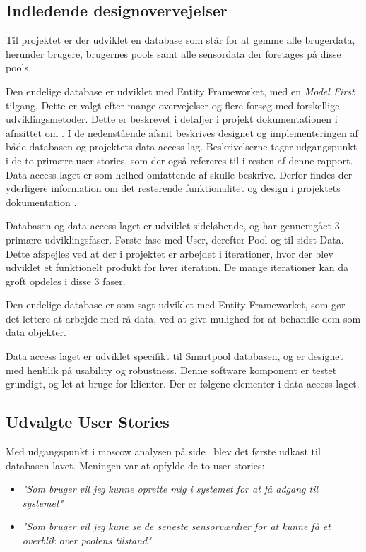 \subsection{Indledende designovervejelser}\label{sec:designdatabase}

Til projektet er der udviklet en database som står for at gemme alle brugerdata, herunder brugere, brugernes pools samt alle sensordata der foretages på disse pools.

Den endelige database er udviklet med Entity Frameworket, med en \textit{Model First} tilgang. Dette er valgt efter mange overvejelser og flere forsøg med forskellige udviklingsmetoder. Dette er beskrevet i detaljer i projekt dokumentationen i afnsittet om . I de nedenstående afsnit beskrives designet og implementeringen af både databasen og projektets data-access lag. Beskrivelserne tager udgangspunkt i de to primære user stories, som der også refereres til i resten af denne rapport. Data-access laget er som helhed omfattende af skulle beskrive. Derfor findes der yderligere information om det resterende funktionalitet og design i projektets dokumentation .

Databasen og data-access laget er udviklet sideløbende, og har gennemgået 3 primære udviklingsfaser. Første fase med User, derefter Pool og til sidst Data. Dette afspejles ved at der i projektet er arbejdet i iterationer, hvor der blev udviklet et funktionelt produkt for hver iteration. De mange iterationer kan da groft opdeles i disse 3 faser.

Den endelige database er som sagt udviklet med Entity Frameworket, som gør det lettere at arbejde med rå data, ved at give mulighed for at behandle dem som data objekter.

Data access laget er udviklet specifikt til Smartpool databasen, og er designet med henblik på usability og robustness. Denne software komponent er testet grundigt, og let at bruge for klienter.
Der er følgene elementer i data-access laget. 
\subsection{Udvalgte User Stories}

Med udgangspunkt i \gls{moscow} analysen på side~\pageref{sec:moscow} blev det første udkast til databasen lavet. Meningen var at opfylde de to user stories: 

\begin{itemize}
	\item \textit{"Som bruger vil jeg kunne oprette mig i systemet for at få adgang til systemet"}
	\item \textit{"Som bruger vil jeg kune se de seneste sensorværdier for at kunne få et overblik over poolens tilstand"}
\end{itemize}

